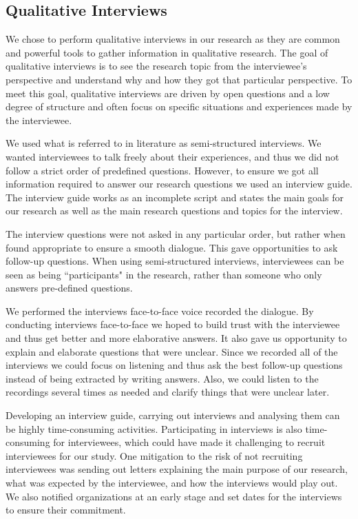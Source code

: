 \subsection{Qualitative Interviews}
\label{sec:interviews}
We chose to perform qualitative interviews in our research as they are common and powerful tools to gather information in qualitative research\cite{myers2007qualitative}. The goal of qualitative interviews is to see the research topic from the interviewee's perspective and understand why and how they got that particular perspective\cite{cassell2004essential}. To meet this goal, qualitative interviews are driven by open questions and a low degree of structure and often focus on specific situations and experiences made by the interviewee. 

We used what is referred to in literature as semi-structured interviews\cite{cassell2004essential}. We wanted interviewees to talk freely about their experiences, and thus we did not follow a strict order of predefined questions. However, to ensure we got all information required to answer our research questions we used an interview guide. The interview guide works as an incomplete script and states the main goals for our research as well as the main research questions and topics for the interview.

The interview questions were not asked in any particular order, but rather when found appropriate to ensure a smooth dialogue. This gave opportunities to ask follow-up questions. When using semi-structured interviews, interviewees can be seen as being ``participants" in the research, rather than someone who only answers pre-defined questions.

We performed the interviews face-to-face voice recorded the dialogue. By conducting interviews face-to-face we hoped to build trust with the interviewee and thus get better and more elaborative answers. It also gave us opportunity to explain and elaborate questions that were unclear. Since we recorded all of the interviews we could focus on listening and thus ask the best follow-up questions instead of being extracted by writing answers. Also, we could listen to the recordings several times as needed and clarify things that were unclear later.

Developing an interview guide, carrying out interviews and analysing them can be highly time-consuming activities. Participating in interviews is also time-consuming for interviewees, which could have made it challenging to recruit interviewees for our study. One mitigation to the risk of not recruiting interviewees was sending out letters explaining the main purpose of our research, what was expected by the interviewee, and how the interviews would play out. We also notified organizations at an early stage and set dates for the interviews to ensure their commitment.

